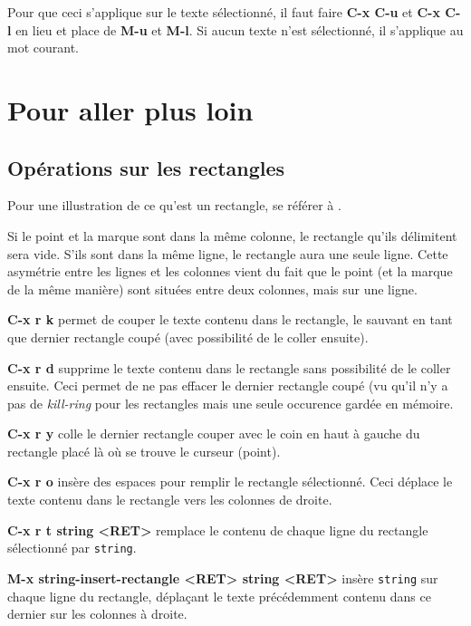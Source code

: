 \documentclass[a4paper,twoside]{article}
\newcommand{\raccourci}[1]{{\bfseries #1}}
\begin{document}
\begin{remarque}
Pour que ceci s'applique sur le texte sélectionné, il faut faire \raccourci{C-x C-u} et \raccourci{C-x C-l} en lieu et place de \raccourci{M-u} et \raccourci{M-l}. Si aucun texte n'est sélectionné, il s'applique au mot courant.
\end{remarque}

\section{Pour aller plus loin}
\subsection{Opérations sur les rectangles}\label{sec:rectangles}
Pour une illustration de ce qu'est un rectangle, se référer à .

Si le point et la marque sont dans la même colonne, le rectangle qu'ils délimitent sera vide. S'ils sont dans la même ligne, le rectangle aura une seule ligne. Cette asymétrie entre les lignes et les colonnes vient du fait que le point (et la marque de la même manière) sont situées entre deux colonnes, mais sur une ligne.

\bigskip

\raccourci{C-x r k} permet de couper le texte contenu dans le rectangle, le sauvant en tant que dernier rectangle coupé (avec possibilité de le coller ensuite).

\raccourci{C-x r d} supprime le texte contenu dans le rectangle sans possibilité de le coller ensuite. Ceci permet de ne pas effacer le dernier rectangle coupé (vu qu'il n'y a pas de \emph{kill-ring} pour les rectangles mais une seule occurence gardée en mémoire.

\raccourci{C-x r y} colle le dernier rectangle couper avec le coin en haut à gauche du rectangle placé là où se trouve le curseur (point).

\raccourci{C-x r o} insère des espaces pour remplir le rectangle sélectionné. Ceci déplace le texte contenu dans le rectangle vers les colonnes de droite.

\raccourci{C-x r t string <RET>} remplace le contenu de chaque ligne du rectangle sélectionné par \texttt{string}.

\raccourci{M-x string-insert-rectangle <RET> string <RET>} insère \texttt{string} sur chaque ligne du rectangle, déplaçant le texte précédemment contenu dans ce dernier sur les colonnes à droite.
\end{document}
